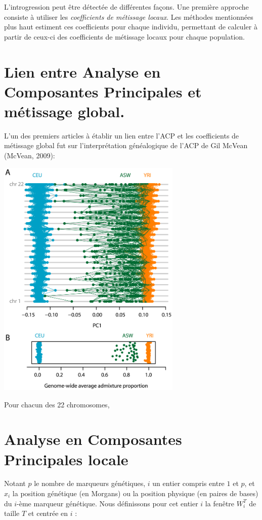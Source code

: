 \documentclass[12pt,twoside]{reedthesis}
\theoremstyle{definition}
\theoremstyle{definition}
\theoremstyle{remark}
\begin{document}
  L'introgression peut être détectée de différentes façons. Une première
  approche consiste à utiliser les \emph{coefficients de métissage
  locaux}. Les méthodes mentionnées plus haut estiment ces coefficients
  pour chaque individu, permettant de calculer à partir de ceux-ci des
  coefficients de métissage locaux pour chaque population.
  
  \section{Lien entre Analyse en Composantes Principales et métissage
  global.}\label{lien-entre-analyse-en-composantes-principales-et-metissage-global.}
  
  L'un des premiers articles à établir un lien entre l'ACP et les
  coefficients de métissage global fut sur l'interprétation généalogique
  de l'ACP de Gil McVean (McVean, 2009):
  
  \includegraphics[width=250pt]{figure/mcvean.png}
  
  Pour chacun des 22 chromosomes,
  
  \section{Analyse en Composantes Principales
  locale}\label{analyse-en-composantes-principales-locale}
  
  Notant \(p\) le nombre de marqueurs génétiques, \(i\) un entier compris
  entre \(1\) et \(p\), et \(x_i\) la position génétique (en Morgans) ou
  la position physique (en paires de bases) du \(i\)-ème marqueur
  génétique. Nous définissons pour cet entier \(i\) la fenêtre \(W_i^T\)
  de taille \(T\) et centrée en \(i\) :
  
\end{document}
